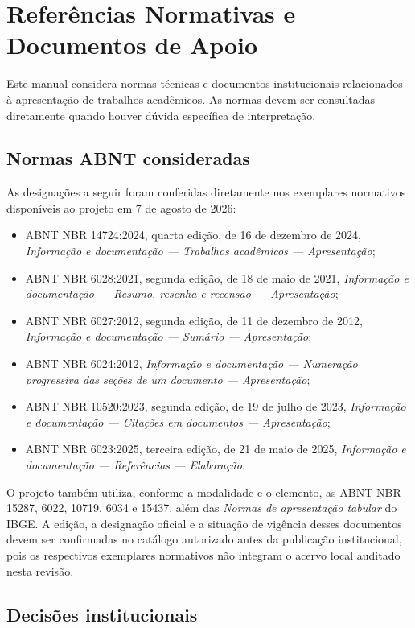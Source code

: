 \chapter{Referências Normativas e Documentos de Apoio}

Este manual considera normas técnicas e documentos institucionais relacionados à apresentação de trabalhos acadêmicos. As normas devem ser consultadas diretamente quando houver dúvida específica de interpretação.

\section{Normas ABNT consideradas}

As designações a seguir foram conferidas diretamente nos exemplares normativos disponíveis ao projeto em 7 de agosto de 2026:

\begin{itemize}
  \item ABNT NBR 14724:2024, quarta edição, de 16 de dezembro de 2024, \emph{Informação e documentação --- Trabalhos acadêmicos --- Apresentação};
  \item ABNT NBR 6028:2021, segunda edição, de 18 de maio de 2021, \emph{Informação e documentação --- Resumo, resenha e recensão --- Apresentação};
  \item ABNT NBR 6027:2012, segunda edição, de 11 de dezembro de 2012, \emph{Informação e documentação --- Sumário --- Apresentação};
  \item ABNT NBR 6024:2012, \emph{Informação e documentação --- Numeração progressiva das seções de um documento --- Apresentação};
  \item ABNT NBR 10520:2023, segunda edição, de 19 de julho de 2023, \emph{Informação e documentação --- Citações em documentos --- Apresentação};
  \item ABNT NBR 6023:2025, terceira edição, de 21 de maio de 2025, \emph{Informação e documentação --- Referências --- Elaboração}.
\end{itemize}

O projeto também utiliza, conforme a modalidade e o elemento, as ABNT NBR 15287, 6022, 10719, 6034 e 15437, além das \emph{Normas de apresentação tabular} do IBGE. A edição, a designação oficial e a situação de vigência desses documentos devem ser confirmadas no catálogo autorizado antes da publicação institucional, pois os respectivos exemplares normativos não integram o acervo local auditado nesta revisão.

\section{Decisões institucionais}

